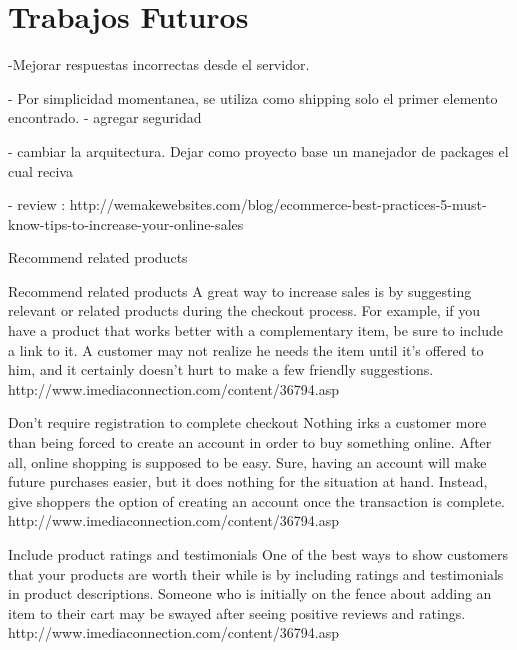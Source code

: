\chapter{Trabajos Futuros}\label{cap:trabajos_futuros}
-Mejorar respuestas incorrectas desde el servidor.

- Por simplicidad momentanea, se utiliza como shipping solo el primer elemento encontrado.
 - agregar seguridad

 - cambiar la arquitectura. Dejar como proyecto base un manejador de packages el cual reciva



- review : 
http://wemakewebsites.com/blog/ecommerce-best-practices-5-must-know-tips-to-increase-your-online-sales

Recommend related products

Recommend related products
A great way to increase sales is by suggesting relevant or related products during the checkout process. For example, if you have a product that works better with a complementary item, be sure to include a link to it. A customer may not realize he needs the item until it's offered to him, and it certainly doesn't hurt to make a few friendly suggestions.
http://www.imediaconnection.com/content/36794.asp



Don't require registration to complete checkout
Nothing irks a customer more than being forced to create an account in order to buy something online. After all, online shopping is supposed to be easy. Sure, having an account will make future purchases easier, but it does nothing for the situation at hand. Instead, give shoppers the option of creating an account once the transaction is complete.
http://www.imediaconnection.com/content/36794.asp

Include product ratings and testimonials
One of the best ways to show customers that your products are worth their while is by including ratings and testimonials in product descriptions. Someone who is initially on the fence about adding an item to their cart may be swayed after seeing positive reviews and ratings.
http://www.imediaconnection.com/content/36794.asp








